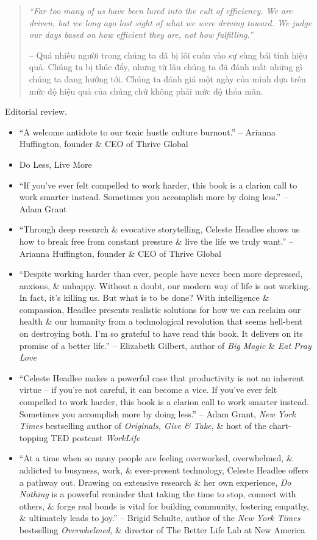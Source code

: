 \documentclass{article}
\begin{document}
\begin{enumerate}
\begin{quotation}
		{\it``Far too many of us have been lured into the cult of efficiency. We are driven, but we long ago lost sight of what we were driving toward. We judge our days based on how efficient they are, not how fulfilling.''}
		
		-- Quá nhiều người trong chúng ta đã bị lôi cuốn vào sự sùng bái tính hiệu quả. Chúng ta bị thúc đẩy, nhưng từ lâu chúng ta đã đánh mất những gì chúng ta đang hướng tới. Chúng ta đánh giá một ngày của mình dựa trên mức độ hiệu quả của chúng chứ không phải mức độ thỏa mãn.
	\end{quotation}
	{\sf Editorial review.}
	\begin{itemize}
		\item ``A welcome antidote to our toxic hustle culture burnout.'' -- {\sc Arianna Huffington}, founder \& CEO of Thrive Global
		\item Do Less, Live More
		\item ``If you've ever felt compelled to work harder, this book is a clarion call to work smarter instead. Sometimes you accomplish more by doing less.'' -- {\sc Adam Grant}
		\item ``Through deep research \& evocative storytelling, {\sc Celeste Headlee} shows us how to break free from constant pressure \& live the life we truly want.'' -- {\sc Arianna Huffington}, founder \& CEO of Thrive Global
		\item ``Despite working harder than ever, people have never been more depressed, anxious, \& unhappy. Without a doubt, our modern way of life is not working. In fact, it's killing us. But what is to be done? With intelligence \& compassion, {\sc Headlee} presents realistic solutions for how we can reclaim our health \& our humanity from a technological revolution that seems hell-bent on destroying both. I'm so grateful to have read this book. It delivers on its promise of a better life.'' -- {\sc Elizabeth Gilbert}, author of {\it Big Magic} \& {\it Eat Pray Love}
		\item ``{\sc Celeste Headlee} makes a powerful case that productivity is not an inherent virtue -- if you're not careful, it can become a vice. If you've ever felt compelled to work harder, this book is a clarion call to work smarter instead. Sometimes you accomplish more by doing less.'' -- {\sc Adam Grant}, {\it New York Times} bestselling author of {\it Originals, Give \& Take}, \& host of the chart-topping TED postcast {\it WorkLife}
		\item ``At a time when so many people are feeling overworked, overwhelmed, \& addicted to busyness, work, \& ever-present technology, {\sc Celeste Headlee} offers a pathway out. Drawing on extensive research \& her own experience, {\it Do Nothing} is a powerful reminder that taking the time to stop, connect with others, \& forge real bonds is vital for building community, fostering empathy, \& ultimately leads to joy.'' -- {\sc Brigid Schulte}, author of the {\it New York Times} bestselling {\it Overwhelmed}, \& director of The Better Life Lab at New America

\end{itemize}
\end{enumerate}
\end{document}
